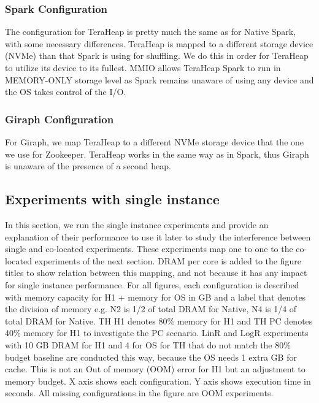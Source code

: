 \subsubsection{Spark Configuration}
The configuration for TeraHeap is pretty much the same as for Native
Spark, with some necessary differences. TeraHeap
is mapped to a different storage device (NVMe) than that Spark is
using for shuffling. We do this in order for TeraHeap to utilize its
device to its fullest. MMIO allows TeraHeap Spark to run in
MEMORY-ONLY storage level as Spark remains unaware of using any device and
the OS takes control of the I/O.

\subsubsection{Giraph Configuration}
For Giraph, we map TeraHeap to a different NVMe storage device that the one we
use for Zookeeper. TeraHeap works in the same way as in Spark,
thus Giraph is unaware of the presence of a second heap.

\subsection{Experiments with single instance}

In this section, we run the single instance experiments and provide an explanation of their performance to use it later to study the interference between single and co-located experiments.
These experiments map one to one to the co-located experiments of the next section.
DRAM per core is added to the figure titles to show relation between this mapping, and not because it has any impact
for single instance performance. For all figures, each configuration is described with memory capacity for H1 + memory for OS in GB and a label that denotes the division of memory e.g. N2 is 1/2 of total DRAM for Native, N4 is 1/4 of total DRAM for Native. TH H1 denotes 80\% memory for H1 and TH PC denotes 40\% memory for H1 to investigate the PC scenario. LinR and LogR experiments with 10 GB DRAM for H1 and 4 for OS for TH that do not match the 80\% budget baseline are conducted this way, because the OS needs 1 extra GB for cache. This is not an Out of memory (OOM) error for H1 but an adjustment to memory budget.
X axis shows each configuration. Y axis shows execution time in seconds. All missing configurations in the figure are OOM experiments.

